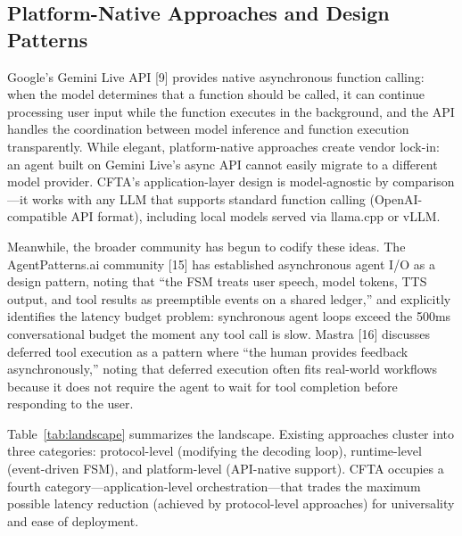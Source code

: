 \documentclass[numbered,mediumone,traditional]{oup-authoring-template}
\begin{document}
\subsection{Platform-Native Approaches and Design Patterns}

Google's Gemini Live API [9] provides native asynchronous function calling: when the model determines that a function should be called, it can continue processing user input while the function executes in the background, and the API handles the coordination between model inference and function execution transparently. While elegant, platform-native approaches create vendor lock-in: an agent built on Gemini Live's async API cannot easily migrate to a different model provider. CFTA's application-layer design is model-agnostic by comparison---it works with any LLM that supports standard function calling (OpenAI-compatible API format), including local models served via llama.cpp or vLLM.

Meanwhile, the broader community has begun to codify these ideas. The AgentPatterns.ai community [15] has established asynchronous agent I/O as a design pattern, noting that ``the FSM treats user speech, model tokens, TTS output, and tool results as preemptible events on a shared ledger,'' and explicitly identifies the latency budget problem: synchronous agent loops exceed the 500ms conversational budget the moment any tool call is slow. Mastra [16] discusses deferred tool execution as a pattern where ``the human provides feedback asynchronously,'' noting that deferred execution often fits real-world workflows because it does not require the agent to wait for tool completion before responding to the user.

Table~\ref{tab:landscape} summarizes the landscape. Existing approaches cluster into three categories: protocol-level (modifying the decoding loop), runtime-level (event-driven FSM), and platform-level (API-native support). CFTA occupies a fourth category---application-level orchestration---that trades the maximum possible latency reduction (achieved by protocol-level approaches) for universality and ease of deployment.
\end{document}
